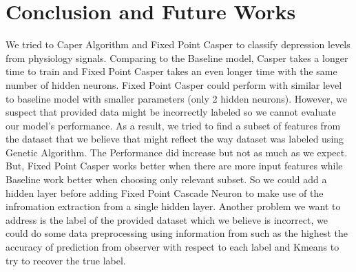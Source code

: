 \documentclass[runningheads]{llncs}
\begin{document}
\section{Conclusion and Future Works}
We tried to Caper Algorithm and Fixed Point Casper to classify depression levels from physiology signals. Comparing to the Baseline model, Casper takes a longer time to train and Fixed Point Casper takes an even longer time with the same number of hidden neurons. Fixed Point Casper could perform with similar level to baseline model with smaller parameters (only 2 hidden neurons). However, we suspect that provided data might be incorrectly labeled so we cannot evaluate our model's performance. As a result, we tried to find a subset of features from the dataset that we believe that might reflect the way dataset was labeled using Genetic Algorithm. The Performance did increase but not as much as we expect. But, Fixed Point Casper works better when there are more input features while Baseline work better when choosing only relevant subset. So we could add a hidden layer before adding Fixed Point Cascade Neuron to make use of the infromation extraction from a single hidden layer. Another problem we want to address is the label of the provided dataset which we believe is incorrect, we could do some data preprocessing using information from \cite{data_paper} such as the highest the accuracy of prediction from observer with respect to each label and Kmeans to try to recover the true label.
%
%
%
% 
% 
%


\end{document}
